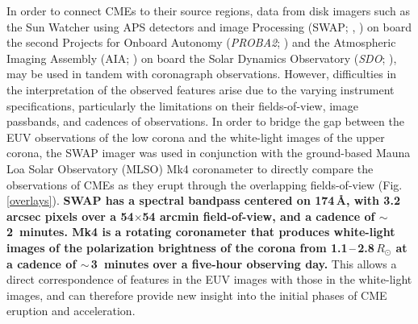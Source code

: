 \documentclass[namedreferences]{solarphysics}
\begin{document}
\begin{article}
In order to connect CMEs to their source regions, data from disk imagers such as the Sun Watcher using APS detectors and image Processing (SWAP; , ) on board the second Projects for Onboard Autonomy (\emph{PROBA2}; ) and the Atmospheric Imaging Assembly (AIA; ) on board the Solar Dynamics Observatory (\emph{SDO}; ), may be used in tandem with coronagraph observations. However, difficulties in the interpretation of the observed features arise due to the varying instrument specifications, particularly the limitations on their fields-of-view, image passbands, and cadences of observations. In order to bridge the gap between the EUV observations of the low corona and the white-light images of the upper corona, the SWAP imager was used in conjunction with the ground-based Mauna Loa Solar Observatory (MLSO) Mk4 coronameter \cite{2003SPIE.4843...66E} to directly compare the observations of CMEs as they erupt through the overlapping fields-of-view (Fig.\,\ref{overlays}). {\bf SWAP has a spectral bandpass centered on 174\,{\AA}, with 3.2 arcsec pixels over a 54$\times$54 arcmin field-of-view, and a cadence of $\sim$\,2~minutes. Mk4 is a rotating coronameter that produces white-light images of the polarization brightness of the corona from 1.1\,--\,2.8\,$R_{\odot}$ at a cadence of $\sim$\,3~minutes over a five-hour observing day.} This allows a direct correspondence of features in the EUV images with those in the white-light images, and can therefore provide new insight into the initial phases of CME eruption and acceleration.


\end{article}
\end{document}
